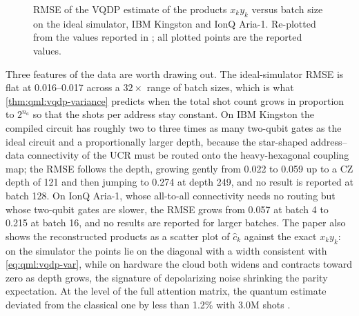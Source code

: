\begin{figure}[htbp]
\centering
{}
\caption{RMSE of the VQDP estimate of the products $x_k y_k$ versus batch size on the ideal simulator, IBM Kingston and IonQ Aria-1. Re-plotted from the values reported in \cite{guo2025vqt}; all plotted points are the reported values.}\label{fig:qml:vqt-rmse}
\end{figure}

Three features of the data are worth drawing out. The ideal-simulator RMSE is flat at 0.016--0.017 across a $32\times$ range of batch sizes, which is what \cref{thm:qml:vqdp-variance} predicts when the total shot count grows in proportion to $2^{n_a}$ so that the shots per address stay constant. On IBM Kingston the compiled circuit has roughly two to three times as many two-qubit gates as the ideal circuit and a proportionally larger depth, because the star-shaped address--data connectivity of the UCR must be routed onto the heavy-hexagonal coupling map; the RMSE follows the depth, growing gently from 0.022 to 0.059 up to a CZ depth of 121 and then jumping to 0.274 at depth 249, and no result is reported at batch 128. On IonQ Aria-1, whose all-to-all connectivity needs no routing but whose two-qubit gates are slower, the RMSE grows from 0.057 at batch 4 to 0.215 at batch 16, and no results are reported for larger batches. The paper also shows the reconstructed products as a scatter plot of $\hat{c}_k$ against the exact $x_k y_k$: on the simulator the points lie on the diagonal with a width consistent with \cref{eq:qml:vqdp-var}, while on hardware the cloud both widens and contracts toward zero as depth grows, the signature of depolarizing noise shrinking the parity expectation. At the level of the full attention matrix, the quantum estimate deviated from the classical one by less than 1.2\% with $3.0$M shots \cite{guo2025vqt}.


